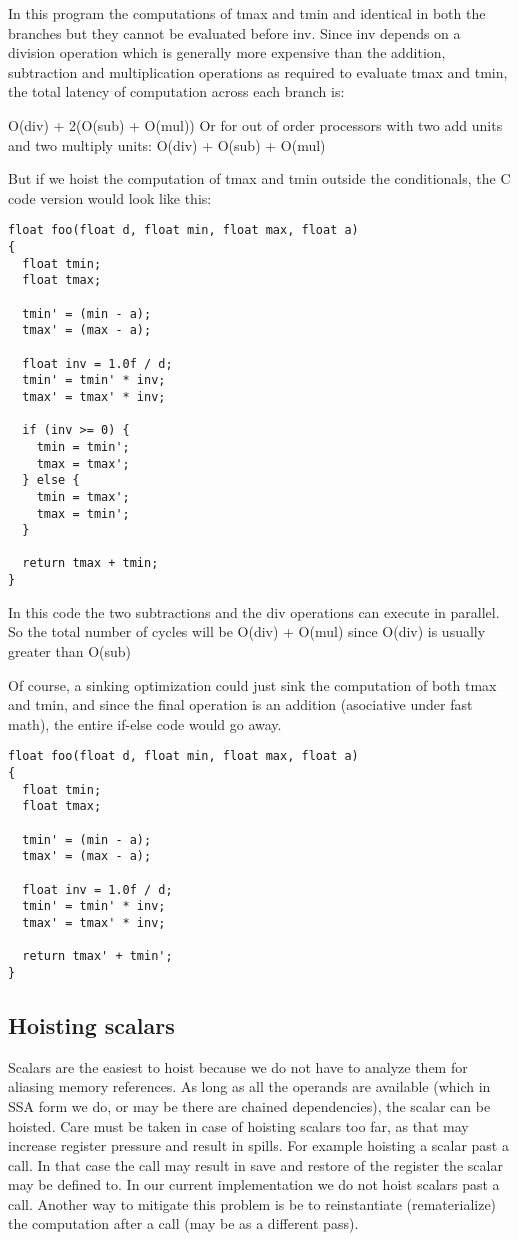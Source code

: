 \documentclass{sig-alternate}
\begin{document}
In this program the computations of tmax and tmin and identical in
both the branches but they cannot be evaluated before inv. Since inv
depends on a division operation which is generally more expensive than
the addition, subtraction and multiplication operations as required to
evaluate tmax and tmin, the total latency of computation across each
branch is:

O(div) + 2(O(sub) + O(mul))
Or for out of order processors with two add units and two multiply units:
O(div) + O(sub) + O(mul)

But if we hoist the computation of tmax and tmin outside the
conditionals, the C code version would look like this:
\begin{verbatim}
float foo(float d, float min, float max, float a)
{
  float tmin;
  float tmax;

  tmin' = (min - a);
  tmax' = (max - a);

  float inv = 1.0f / d;
  tmin' = tmin' * inv;
  tmax' = tmax' * inv;

  if (inv >= 0) {
    tmin = tmin';
    tmax = tmax';
  } else {
    tmin = tmax';
    tmax = tmin';
  }

  return tmax + tmin;
}

\end{verbatim}

In this code the two subtractions and the div operations can execute
in parallel. So the total number of cycles will be O(div) + O(mul)
since O(div) is usually greater than O(sub)

Of course, a sinking optimization could just sink the computation of
both tmax and tmin, and since the final operation is an addition
(asociative under fast math), the entire if-else code would go away.

\begin{verbatim}
float foo(float d, float min, float max, float a)
{
  float tmin;
  float tmax;

  tmin' = (min - a);
  tmax' = (max - a);

  float inv = 1.0f / d;
  tmin' = tmin' * inv;
  tmax' = tmax' * inv;

  return tmax' + tmin';
}
\end{verbatim}

\subsection{Hoisting scalars}
Scalars are the easiest to hoist because we do not have to analyze
them for aliasing memory references. As long as all the operands are
available (which in SSA form we do, or may be there are chained
dependencies), the scalar can be hoisted. Care must be taken in case
of hoisting scalars too far, as that may increase register pressure
and result in spills. For example hoisting a scalar past a call. In
that case the call may result in save and restore of the register the
scalar may be defined to. In our current implementation we do not
hoist scalars past a call. Another way to mitigate this problem is be
to reinstantiate (rematerialize) the computation after a call (may be
as a different pass).
\end{document}

